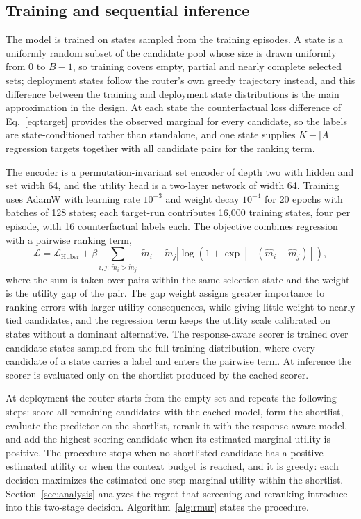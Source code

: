 \subsection{Training and sequential inference}

The model is trained on states sampled from the training episodes. A state is
a uniformly random subset of the candidate pool whose size is drawn uniformly
from $0$ to $B-1$, so training covers empty, partial and nearly complete
selected sets; deployment states follow the router's own greedy trajectory
instead, and this difference between the training and deployment state
distributions is the main approximation in the design. At each state the
counterfactual loss difference of Eq.~\eqref{eq:target} provides the observed
marginal for every candidate, so the labels are state-conditioned rather than
standalone, and one state supplies $K-|A|$ regression targets together with all
candidate pairs for the ranking term.

The encoder is a permutation-invariant set encoder of depth two with hidden and
set width 64, and the utility head is a two-layer network of width 64. Training
uses AdamW with learning rate $10^{-3}$ and weight decay $10^{-4}$ for 20
epochs with batches of 128 states; each target-run contributes 16{,}000
training states, four per episode, with 16 counterfactual labels each. The objective combines regression with a pairwise ranking term,
\begin{equation}
 \mathcal L
 =
 \mathcal L_{\mathrm{Huber}}
 +
 \beta
 \sum_{i,j:\,\widetilde m_i>\widetilde m_j}
 |\widetilde m_i-\widetilde m_j|
 \log\!\left(
 1+\exp\!\left[-(\widehat m_i-\widehat m_j)\right]
 \right),
 \label{eq:loss}
\end{equation}
where the sum is taken over pairs within the same selection state and the
weight is the utility gap of the pair. The gap weight assigns greater
importance to ranking errors with larger utility consequences, while giving
little weight to nearly tied candidates, and the regression term keeps the
utility scale calibrated on states without a dominant alternative. The
response-aware scorer is trained over candidate states sampled from the full
training distribution, where every candidate of a state carries a label and
enters the pairwise term. At inference the scorer is evaluated only on the
shortlist produced by the cached scorer.

At deployment the router starts from the empty set and repeats the following
steps: score all remaining candidates with the cached model, form the
shortlist, evaluate the predictor on the shortlist, rerank it with the
response-aware model, and add the highest-scoring candidate when its estimated
marginal utility is positive. The procedure stops when no shortlisted candidate
has a positive estimated utility or when the context budget is reached, and it
is greedy: each decision maximizes the estimated one-step marginal utility
within the shortlist. Section~\ref{sec:analysis} analyzes the regret that
screening and reranking introduce into this two-stage decision.
Algorithm~\ref{alg:rmur} states the procedure.

